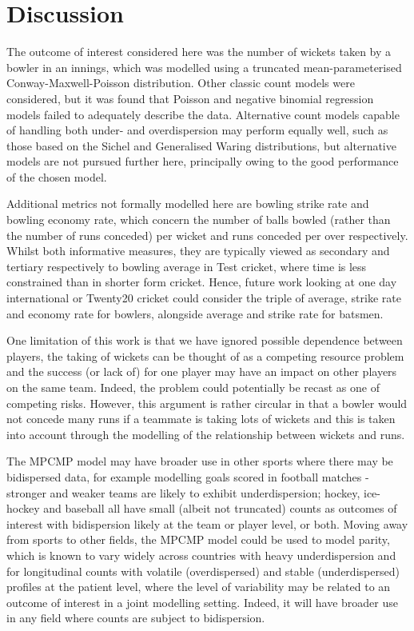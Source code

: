 \documentclass{statsoc}
\newcommand{\pmp}[1]{\textcolor{blue}{#1}}
\begin{document}

\section{Discussion}
The outcome of interest considered here was the number of wickets taken by a bowler in an innings, which was modelled using a truncated mean-parameterised Conway-Maxwell-Poisson distribution. Other classic count models were considered, but it was found that Poisson and negative binomial regression models failed to adequately describe the data. Alternative count models capable of handling both under- and overdispersion may perform equally well, such as those based on the Sichel and Generalised Waring distributions, but alternative models are not pursued further here, principally owing to the good performance of the chosen model.

Additional metrics not formally modelled here are bowling strike rate and bowling economy rate, which concern the number of balls bowled (rather than the number of runs conceded) per wicket and runs conceded per over respectively. Whilst both informative measures, they are typically viewed as secondary and tertiary respectively to bowling average in Test cricket, where time is less constrained than in shorter form cricket. Hence, future work looking at one day international or Twenty20 cricket could consider the triple of average, strike rate and economy rate for bowlers, alongside average and strike rate for batsmen. 

One limitation of this work is that we have ignored possible dependence between players, the taking of wickets can be thought of as a competing resource problem and the success (or lack of) for one player may have an impact on other players on the same team. Indeed, the problem could potentially be recast as one of competing risks. However, this argument is rather circular in that a bowler would not concede many runs if a teammate is taking lots of wickets and this is taken into account through the modelling of the relationship between wickets and runs.

The MPCMP model may have broader use in other sports where there may be bidispersed data, for example modelling goals scored in football matches - stronger and weaker teams are likely to exhibit underdispersion; hockey, ice-hockey and baseball all have small (albeit not truncated) counts as outcomes of interest with bidispersion likely at the team or player level, or both. Moving away from sports to other fields, the MPCMP model could be used to model parity, which is known to vary widely across countries with heavy underdispersion \citep{Barakat2016} and for longitudinal counts with volatile (overdispersed) and stable (underdispersed) profiles at the patient level, where the level of variability may be related to an outcome of interest in a joint modelling setting. Indeed, it will have broader use in any field where counts are subject to bidispersion.
\end{document}
